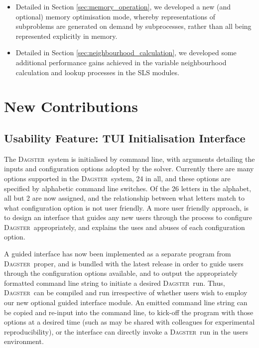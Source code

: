 \documentclass[10pt,a4paper,oneside,headinclude,footinclude,BCOR5mm]{scrartcl}
\newcommand{\dagster}{\textsc{Dagster}\xspace}
\begin{document}
\begin{itemize}
\item	Detailed in Section \ref{sec:memory_operation}, we developed a new (and optional) memory optimisation mode, whereby representations of subproblems are generated on demand by subprocesses, rather than all being represented explicitly in memory.

\item	Detailed in Section \ref{sec:neighbourhood_calculation}, we developed some additional performance gains achieved in the variable neighbourhood calculation and lookup processes in the SLS modules.
  
\end{itemize}

\section{New Contributions}

\subsection{Usability Feature: TUI Initialisation Interface}\label{sec:tui_wizard}

The \dagster\ system is initialised by command line, with arguments detailing the inputs and configuration options adopted by the solver.
Currently there are many options supported in the \dagster\ system, 24 in all, and these options are specified by alphabetic command line switches.
Of the 26 letters in the alphabet, all but 2 are now assigned, and the relationship between what letters match to what configuration option is not user friendly.
A more user friendly approach, is to design an interface that guides any new users through the process to configure \dagster\ appropriately, and explains the uses and abuses of each configuration option. %

A guided interface has now been implemented as a separate program from \dagster\ proper, and is bundled with the latest release in order to guide users through the configuration options available, and to output the appropriately formatted command line string to initiate a desired \dagster\ run.
Thus, \dagster\ can be compiled and run irrespective of whether users wish to employ our new optional guided interface module. 
An emitted command line string can be copied and re-input into the command line, to kick-off the program with those options at a desired time (such as may be shared with colleagues for experimental reproducibility), or the interface can directly invoke a \dagster\ run in the users environment.
\end{document}
